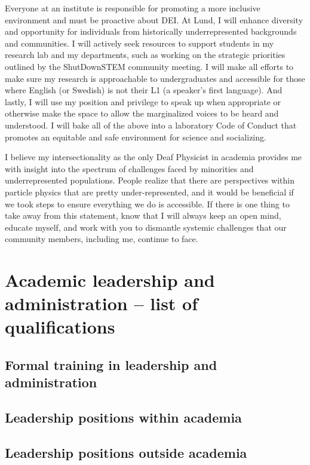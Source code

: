 Everyone at an institute is responsible for promoting a more inclusive environment and must be proactive about DEI. At Lund, I will enhance diversity and opportunity for individuals from historically underrepresented backgrounds and communities. I will actively seek resources to support students in my research lab and my departments, such as working on the strategic priorities outlined by the ShutDownSTEM community meeting. I will make all efforts to make sure my research is approachable to undergraduates and accessible for those where English (or Swedish) is not their L1 (a speaker's first language). And lastly, I will use my position and privilege to speak up when appropriate or otherwise make the space to allow the marginalized voices to be heard and understood. I will bake all of the above into a laboratory Code of Conduct that promotes an equitable and safe environment for science and socializing.

I believe my intersectionality as the only Deaf Physicist in academia provides me with insight into the spectrum of challenges faced by minorities and underrepresented populations. People realize that there are perspectives within particle physics that are pretty under-represented, and it would be beneficial if we took steps to ensure everything we do is accessible. If there is one thing to take away from this statement, know that I will always keep an open mind, educate myself, and work with you to dismantle systemic challenges that our community members, including me, continue to face.

\section{Academic leadership and administration -- list of qualifications} \label{sec:academic-leadership-and-administration-list-of-qualifications}
\subsection{Formal training in leadership and administration \noneyet} \label{ssec:formal-training-in-leadership-and-administration-noneyet}
\subsection{Leadership positions within academia} \label{ssec:leadership-positions-within-academia}
\subsection{Leadership positions outside academia} \label{ssec:leadership-positions-outside-academia}
